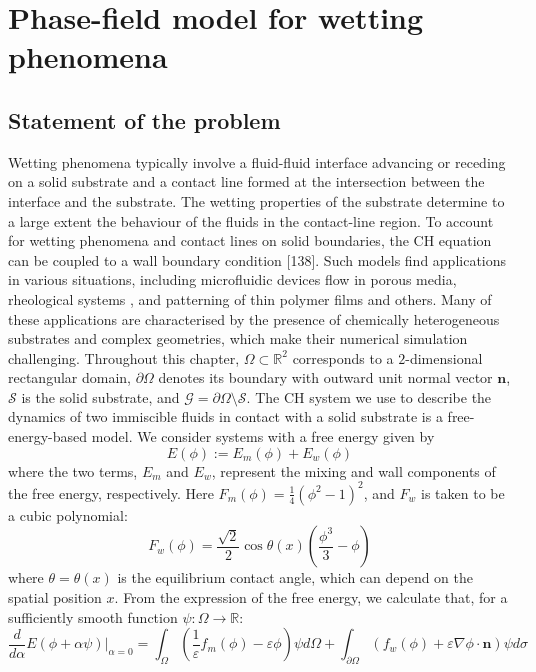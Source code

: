 \documentclass{article}
\begin{document}
\section{Phase-field model for wetting phenomena}
\subsection{Statement of the problem}
Wetting phenomena typically involve a fluid-fluid interface advancing or receding on a solid substrate and a contact line
formed at the intersection between the interface and the substrate. The wetting properties of the substrate determine to a
large extent the behaviour of the fluids in the contact-line region. To account for wetting phenomena and contact lines on solid boundaries, the CH equation can be coupled to a
wall boundary condition [138]. Such models find applications in various situations, including microfluidic
devices  flow in porous media, rheological systems , and patterning of thin polymer films and others. Many
of these applications are characterised by the presence of chemically heterogeneous substrates and complex geometries,
which make their numerical simulation challenging.
Throughout this chapter, $\Omega \subset \mathbb{R}^2$ corresponds to a $2$-dimensional rectangular domain, $\partial \Omega$ denotes its boundary with outward unit normal vector $\mathbf{n}$, $\mathcal{S}$ is the solid substrate, and $\mathcal{G} = \partial \Omega \setminus \mathcal{S}$. The CH system we use to describe the dynamics of two immiscible fluids in contact with a solid substrate is a free-energy-based model. We consider systems with a free energy given by
\begin{equation}
E(\phi) := E_m(\phi) + E_w(\phi)
\end{equation}
where the two terms, $E_m$ and $E_w$, represent the mixing and wall components of the free energy, respectively. Here $F_m(\phi) = \frac{1}{4}(\phi^2 - 1)^2$, and $F_w$ is taken to be a cubic polynomial:
\begin{equation}
F_w(\phi) = \frac{\sqrt{2}}{2} \cos \theta(x)\left(\frac{\phi^3}{3} - \phi\right)
\end{equation}
where $\theta = \theta(x)$ is the equilibrium contact angle, which can depend on the spatial position $x$. From the expression of the free energy, we calculate that, for a sufficiently smooth function $\psi : \Omega \to \mathbb{R}$:
\begin{equation}
\frac{d}{d\alpha}E(\phi + \alpha\psi)\bigg|_{\alpha=0} = \int_{\Omega}\left(\frac{1}{\varepsilon}f_m(\phi) - \varepsilon\phi\right)\psi d\Omega + \int_{\partial \Omega}(f_w(\phi) + \varepsilon\nabla\phi \cdot \mathbf{n})\psi d\sigma
\end{equation}
\end{document}
